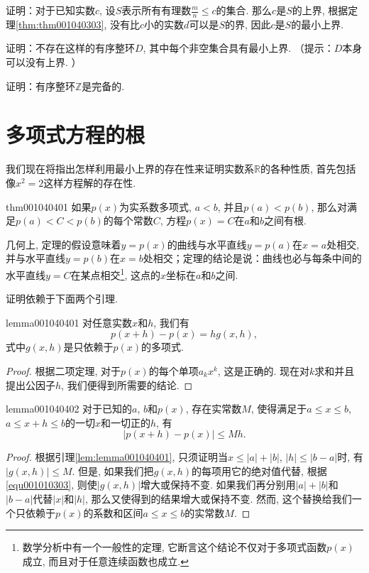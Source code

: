 证明：对于已知实数$c$, 设$S$表示所有有理数$\frac{m}{n} \le c$的集合. 那么$c$是$S$的上界, 根据定理\ref{thm:thm001040303}, 没有比$c$小的实数$d$可以是$S$的界, 因此$c$是$S$的最小上界. 

\begin{exercise}
证明：不存在这样的有序整环$D$, 其中每个非空集合具有最小上界. （提示：$D$本身可以没有上界. ）
\end{exercise}

\begin{exercise}
证明：有序整环$\mathbb{Z}$是完备的. 
\end{exercise}

\section{多项式方程的根}\label{subsection0010404}
我们现在将指出怎样利用最小上界的存在性来证明实数系$\mathbb{R}$的各种性质, 首先包括像$x^2=2$这样方程解的存在性. 
\begin{theorem}{}{thm001040401}
如果$p(x)$为实系数多项式, $a<b$, 并且$p(a)<p(b)$, 那么对满足$p(a)<C<p(b)$的每个常数$C$, 方程$p(x)=C$在$a$和$b$之间有根. 
\end{theorem}

几何上, 定理的假设意味着$y=p(x)$的曲线与水平直线$y=p(a)$在$x=a$处相交, 并与水平直线$y=p(b)$在$x=b$处相交；定理的结论是说：曲线也必与每条中间的水平直线$y=C$在某点相交\footnote{数学分析中有一个一般性的定理, 它断言这个结论不仅对于多项式函数$p(x)$成立, 而且对于任意连续函数也成立. }, 这点的$x$坐标在$a$和$b$之间. 

证明依赖于下面两个引理. 

\begin{lemma}{}{lemma001040401}
对任意实数$x$和$h$, 我们有
\[
p(x+h) - p(x) = hg(x, h),
\]
式中$g(x, h)$是只依赖于$p(x)$的多项式. 
\end{lemma}

\begin{proof}
根据二项定理, 对于$p(x)$的每个单项$a_kx^k$, 这是正确的. 现在对$k$求和并且提出公因子$h$, 我们便得到所需要的结论. 
\end{proof}

\begin{lemma}{}{lemma001040402}
对于已知的$a$, $b$和$p(x)$, 存在实常数$M$, 使得满足于$a \le x \le b$, $a \le x+h \le b$的一切$x$和一切正的$h$, 有
\[
|p(x+h) - p(x)| \le Mh.
\]
\end{lemma}

\begin{proof}
根据引理\ref{lem:lemma001040401}, 只须证明当$x \le |a| + |b|$, $|h| \le |b-a|$时, 有$|g(x, h)| \le M$. 但是, 如果我们把$g(x, h)$的每项用它的绝对值代替, 根据\ref{equ001010303}, 则使$|g(x, h)|$增大或保持不变. 如果我们再分别用$|a| + |b|$和$|b-a|$代替$|x|$和$|h|$, 那么又使得到的结果增大或保持不变. 然而, 这个替换给我们一个只依赖于$p(x)$的系数和区间$a \le x \le b$的实常数$M$. 
\end{proof}

